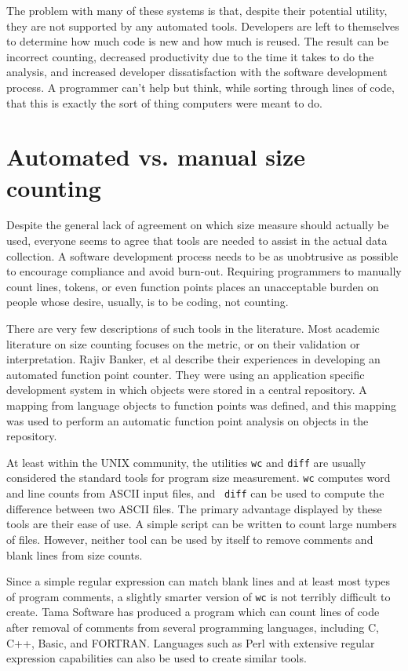 The problem with many of these systems is that, despite their
potential utility, they are not supported by any automated
tools. Developers are left to themselves to determine how much code is
new and how much is reused.  The result can be incorrect counting,
decreased productivity due to the time it takes to do the analysis,
and increased developer dissatisfaction with the software development
process.  A programmer can't help but think, while sorting through
lines of code, that this is exactly the sort of thing computers were
meant to do.


\section{Automated vs. manual size counting}

Despite the general lack of agreement on which size measure should
actually be used, everyone seems to agree that tools are needed to
assist in the actual data collection.  A software development process
needs to be as unobtrusive as possible to encourage compliance and
avoid burn-out.  Requiring programmers to manually count lines,
tokens, or even function points places an unacceptable burden on
people whose desire, usually, is to be coding, not counting.

There are very few descriptions of such tools in the literature.  Most 
academic literature on size counting focuses on the metric, or on their
validation or interpretation.  Rajiv Banker, et al\cite{Banker}
describe their experiences in developing an automated function point
counter.  They were using an application specific development system in
 which objects were stored in a central repository.  A mapping from language 
objects to function points was defined, and this mapping was used to 
perform an automatic function point analysis on objects in the repository.
   
At least within the UNIX community, the utilities {\tt wc} and {\tt diff}
are usually considered the standard tools for program size measurement.
{\tt wc} computes word and line counts from ASCII input files, and {\tt
  diff} can be used to compute the difference between two ASCII files.
The primary advantage displayed by these tools are their ease of use.  A
simple script can be written to count large numbers of files.  However,
neither tool can be used by itself to remove comments and blank lines from
size counts.

Since a simple regular expression can match blank lines and at least most
types of program comments, a slightly smarter version of {\tt wc} is not
terribly difficult to create.  Tama Software\cite{tamasoft} has produced a
program which can count lines of code after removal of comments from
several programming languages, including C, C++, Basic, and FORTRAN.
Languages such as Perl\cite{programming-perl} with extensive regular expression
capabilities can also be used to create similar tools.

